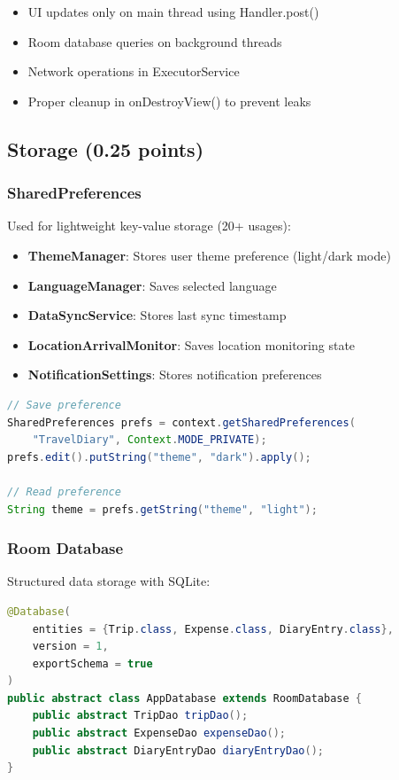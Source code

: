 \documentclass[12pt,a4paper]{article}
\begin{document}
\begin{itemize}
    \item UI updates only on main thread using Handler.post()
    \item Room database queries on background threads
    \item Network operations in ExecutorService
    \item Proper cleanup in onDestroyView() to prevent leaks
\end{itemize}

\subsection{Storage (0.25 points)}

\subsubsection{SharedPreferences}
Used for lightweight key-value storage (20+ usages):

\begin{itemize}
    \item \textbf{ThemeManager}: Stores user theme preference (light/dark mode)
    \item \textbf{LanguageManager}: Saves selected language
    \item \textbf{DataSyncService}: Stores last sync timestamp
    \item \textbf{LocationArrivalMonitor}: Saves location monitoring state
    \item \textbf{NotificationSettings}: Stores notification preferences
\end{itemize}

\begin{lstlisting}[language=Java, caption=SharedPreferences Usage]
// Save preference
SharedPreferences prefs = context.getSharedPreferences(
    "TravelDiary", Context.MODE_PRIVATE);
prefs.edit().putString("theme", "dark").apply();

// Read preference
String theme = prefs.getString("theme", "light");
\end{lstlisting}

\subsubsection{Room Database}
Structured data storage with SQLite:

\begin{lstlisting}[language=Java, caption=Room Database Definition]
@Database(
    entities = {Trip.class, Expense.class, DiaryEntry.class},
    version = 1,
    exportSchema = true
)
public abstract class AppDatabase extends RoomDatabase {
    public abstract TripDao tripDao();
    public abstract ExpenseDao expenseDao();
    public abstract DiaryEntryDao diaryEntryDao();
}
\end{lstlisting}
\end{document}
